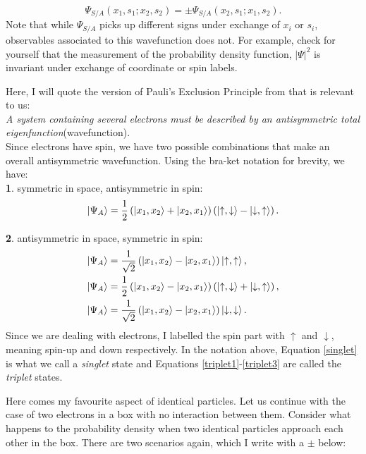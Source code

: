 \documentclass{article}
\numberwithin{equation}{section} %
\begin{document}
\begin{equation}
\Psi_{S/A}(x_1,s_1;x_2,s_2) = \pm \Psi_{S/A}(x_2,s_1;x_1,s_2).
\end{equation}
Note that while $\Psi_{S/A}$ picks up different signs under exchange of $x_i$ or $s_i$, observables associated to this wavefunction does not. For example, check for yourself that the measurement of the probability density function, $\vert \Psi \vert^2$ is invariant under exchange of coordinate or spin labels.

Here, I will quote the version of Pauli's Exclusion Principle from \cite{eisberg} that is relevant to us:\\

\noindent \textit{A system containing several electrons must be described by an antisymmetric total eigenfunction}(wavefunction).\\

Since electrons have spin, we have two possible combinations that make an overall antisymmetric wavefunction. Using the bra-ket notation for brevity, we have: \\

\noindent\textbf{1}. symmetric in space, antisymmetric in spin:
\begin{equation}
\ket{\Psi_A}=\frac{1}{2}\left(\ket{x_1,x_2} + \ket{x_2,x_1}  \right) \left( \ket{\uparrow,\downarrow}-\ket{\downarrow,\uparrow} \right).
\label{singlet}
\end{equation}

\noindent\textbf{2}. antisymmetric in space, symmetric in spin:
\begin{align}
\ket{\Psi_A}&=\frac{1}{\sqrt{2}}\left(\ket{x_1,x_2} - \ket{x_2,x_1}  \right) \ket{\uparrow,\uparrow},\label{triplet1}\\
\ket{\Psi_A}&=\frac{1}{2}\left(\ket{x_1,x_2} - \ket{x_2,x_1}  \right) \left( \ket{\uparrow,\downarrow}+\ket{\downarrow,\uparrow} \right),\label{triplet2}\\
\ket{\Psi_A}&=\frac{1}{\sqrt{2}}\left(\ket{x_1,x_2} - \ket{x_2,x_1}  \right) \ket{\downarrow,\downarrow}\label{triplet3}.
\end{align}
Since we are dealing with electrons, I labelled the spin part with $\uparrow$ and $\downarrow$, meaning spin-up and down respectively. In the notation above, Equation \ref{singlet} is what we call a \textit{singlet} state and Equations \ref{triplet1}-\ref{triplet3} are called the \textit{triplet} states.

Here comes my favourite aspect of identical particles. Let us continue with the case of two electrons in a box with no interaction between them. Consider what happens to the probability density when two identical particles approach each other in the box. There are two scenarios again, which I write with a $\pm$ below:
\end{document}

